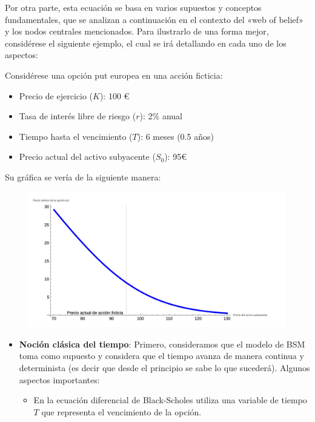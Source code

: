 \begin{problema}[Problema D]
\begin{itemize}
\begin{sol}
Por otra parte, esta ecuación se basa en varios supuestos y conceptos fundamentales, que se analizan a continuación en el contexto del «web of belief» y los nodos centrales mencionados. Para ilustrarlo de una forma mejor, considérese el siguiente ejemplo, el cual se irá detallando en cada uno de los aspectos: 

\begin{cajita}
    Considérese una opción put europea en una acción ficticia: 
    \begin{itemize}
        \item Precio de ejercicio ($K$): 100 €
        \item Tasa de interés libre de riesgo ($r$): 2\% anual
        \item Tiempo hasta el vencimiento ($T$): 6 meses (0.5 años)
        \item Precio actual del activo subyacente ($S_0$): 95€
    \end{itemize}

    Su gráfica se vería de la siguiente manera: 

    \begin{figure}[H]
        \centering
        \includegraphics[scale=0.4]{imagenes/2.png}
    \end{figure}

\end{cajita}

\begin{itemize}
    \item \textbf{Noción clásica del tiempo}:  Primero, consideramos que el modelo de BSM toma como supuesto y considera que el tiempo avanza de manera continua y determinista (es decir que desde el principio se sabe lo que sucederá). Algunos aspectos importantes: 
    \begin{itemize}
        \item  En la ecuación diferencial de Black-Scholes utiliza una variable de tiempo $T$ que representa el vencimiento de la opción. 
    

\end{itemize}
\end{itemize}
\end{sol}
\end{itemize}
\end{problema}
